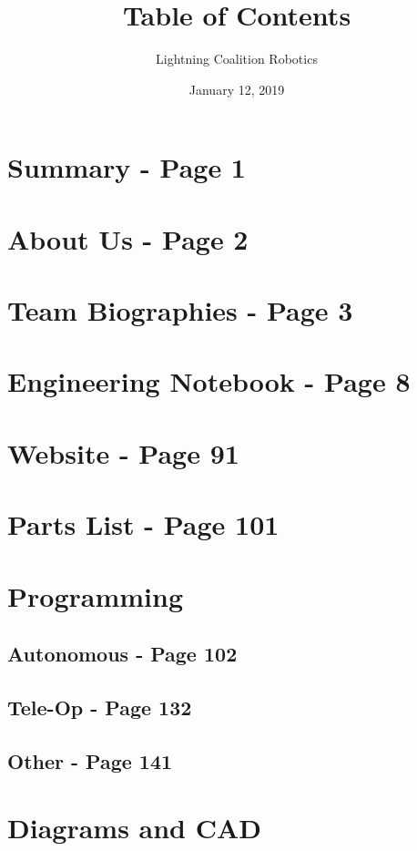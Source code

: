 \documentclass[12pt]{article}
\title{\vspace{-2cm}Table of Contents}
\author{Lightning Coalition Robotics}
\date{January 12, 2019}
\begin{document}
\maketitle

\section{Summary - Page 1}

\section{About Us - Page 2}

\section{Team Biographies - Page 3}

\section{Engineering Notebook - Page 8}

\section{Website - Page 91}

\section{Parts List - Page 101}

\section{Programming}

\subsection{Autonomous - Page 102}

\subsection{Tele-Op - Page 132}

\subsection{Other - Page 141}

\section{Diagrams and CAD}
\end{document}
